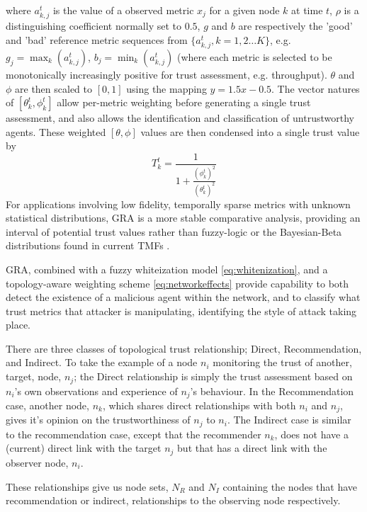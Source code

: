 \documentclass[runningheads,a4paper]{llncs}
\begin{document}
where $a_{k,j}^t$ is the value of a observed metric $x_j$ for a given node $k$ at time $t$, $\rho$ is a distinguishing coefficient normally set to $0.5$, $g$ and $b$ are respectively the 'good' and 'bad' reference metric sequences from $\{a_{k,j}^t, k=1,2\dots K\}$, e.g. $g_j=\max_k({a_{k,j}^t})$,  $b_j=\min_k({a_{k,j}^t})$ (where each metric is selected to be monotonically increasingly positive for trust assessment, e.g. throughput). $\theta$ and $\phi$ are then scaled to $[0,1]$ using the mapping $y = 1.5 x - 0.5$.
The vector natures of $[\theta_k^t,\phi_k^t]$ allow per-metric weighting before generating a single trust assessment, and also allows the identification and classification of untrustworthy agents.
These weighted $[\theta,\phi]$ values are then condensed into a single trust value by
\begin{equation}
  \label{eq:trustvalue}
  T_k^t = \frac{1}{1+\frac{(\phi_k^t)^2}{(\theta_k^t)^2}}
\end{equation}
For applications involving low fidelity, temporally sparse metrics with unknown statistical distributions, GRA is a more stable comparative analysis, providing an interval of potential trust values rather than fuzzy-logic or the Bayesian-Beta distributions found in current TMFs \cite{Liu2006}.

GRA, combined with a fuzzy whiteization model \eqref{eq:whitenization}, and a topology-aware weighting scheme \eqref{eq:networkeffects} provide capability to both detect the existence of a malicious agent within the network, and to classify what trust metrics that attacker is manipulating, identifying the style of attack taking place.

There are three classes of topological trust relationship; Direct, Recommendation, and Indirect.
To take the example of a node $n_i$ monitoring the trust of another, target, node, $n_j$; the Direct relationship is simply the trust assessment based on $n_i$'s own observations and experience of $n_j$'s behaviour.
In the Recommendation case, another node, $n_k$, which shares direct relationships with both $n_i$ and $n_j$, gives it's opinion on the trustworthiness of $n_j$ to $n_i$.
The Indirect case is similar to the recommendation case, except that the recommender $n_k$, does not have a (current) direct link with the target $n_j$ but that has a direct link with the observer node, $n_i$.

These relationships give us node sets, $N_R$ and $N_I$ containing the nodes that have recommendation or indirect, relationships to the observing node respectively.
\end{document}
